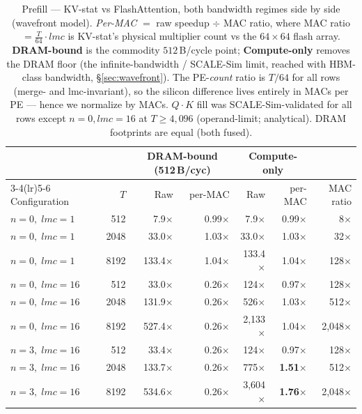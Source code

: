 \documentclass[11pt]{article}
\begin{document}
\begin{table}[H]
\centering
\caption{Prefill --- KV-stat vs FlashAttention, both bandwidth regimes side by side
(wavefront model). \emph{Per-MAC} \(=\) raw speedup \(\div\) MAC ratio, where
MAC ratio \(= \tfrac{T}{64}\!\cdot\! lmc\) is KV-stat's physical multiplier count
vs the \(64{\times}64\) flash array. \textbf{DRAM-bound} is the commodity
\(512\,\)B/cycle point; \textbf{Compute-only} removes the DRAM floor (the
infinite-bandwidth / SCALE-Sim limit, reached with HBM-class bandwidth,
\S\ref{sec:wavefront}). The PE-\emph{count} ratio is \(T/64\) for all rows
(merge- and lmc-invariant), so the silicon difference lives entirely in MACs per
PE --- hence we normalize by MACs. \(Q\!\cdot\!K\) fill was SCALE-Sim-validated for
all rows except \(n=0, lmc=16\) at \(T \geq 4{,}096\) (operand-limit; analytical).
DRAM footprints are equal (both fused).}
\label{tab:prefill_results}
\begin{tabular}{lr rr rr r}
\toprule
& & \multicolumn{2}{c}{DRAM-bound (512\,B/cyc)} & \multicolumn{2}{c}{Compute-only} & \\
\cmidrule(lr){3-4}\cmidrule(lr){5-6}
Configuration & \(T\) & Raw & per-MAC & Raw & per-MAC & MAC ratio \\
\midrule
\(n=0,\;lmc=1\)  &  512 &   7.9$\times$ & 0.99$\times$ &   7.9$\times$ & 0.99$\times$ &     8$\times$ \\
\(n=0,\;lmc=1\)  & 2048 &  33.0$\times$ & 1.03$\times$ &  33.0$\times$ & 1.03$\times$ &    32$\times$ \\
\(n=0,\;lmc=1\)  & 8192 & 133.4$\times$ & 1.04$\times$ & 133.4$\times$ & 1.04$\times$ &   128$\times$ \\
\midrule
\(n=0,\;lmc=16\) &  512 &  33.0$\times$ & 0.26$\times$ &   124$\times$ & 0.97$\times$ &   128$\times$ \\
\(n=0,\;lmc=16\) & 2048 & 131.9$\times$ & 0.26$\times$ &   526$\times$ & 1.03$\times$ &   512$\times$ \\
\(n=0,\;lmc=16\) & 8192 & 527.4$\times$ & 0.26$\times$ & 2{,}133$\times$ & 1.04$\times$ & 2{,}048$\times$ \\
\midrule
\(n=3,\;lmc=16\) &  512 &  33.4$\times$ & 0.26$\times$ &   124$\times$ & 0.97$\times$ &   128$\times$ \\
\(n=3,\;lmc=16\) & 2048 & 133.7$\times$ & 0.26$\times$ &   775$\times$ & \textbf{1.51$\times$} &   512$\times$ \\
\(n=3,\;lmc=16\) & 8192 & 534.6$\times$ & 0.26$\times$ & 3{,}604$\times$ & \textbf{1.76$\times$} & 2{,}048$\times$ \\
\bottomrule
\end{tabular}
\end{table}
\end{document}
